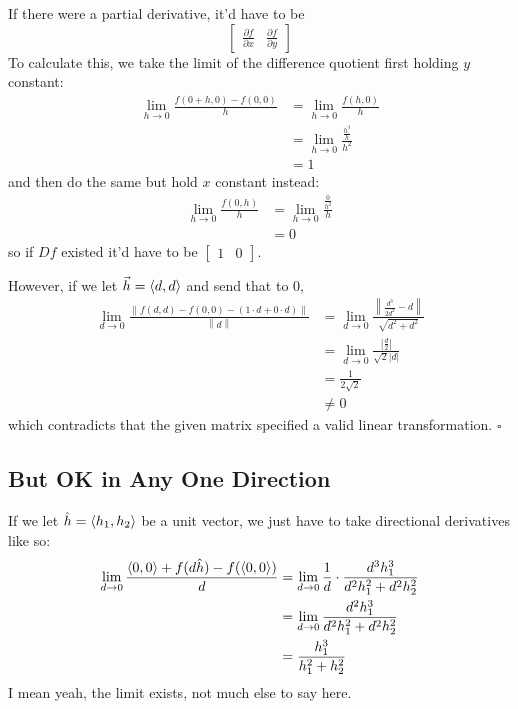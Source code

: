 \documentclass[12pt]{article}
\newcommand{\norm}[1]{\left\lVert#1\right\rVert}
\begin{document}
If there were a partial derivative, it'd have to be
\[\begin{bmatrix}\frac{\partial f}{\partial x} & \frac{\partial f}{\partial y}\end{bmatrix}\]
To calculate this, we take the limit of the difference quotient first holding $y$ constant:
\begin{align*}
  \lim_{h \to 0} \frac{f(0 + h, 0)-f(0, 0)}{h}
   & = \lim_{h \to 0} \frac{f(h, 0)}{h}         \\
   & = \lim_{h \to 0} \frac{\frac{h^3}{h}}{h^2} \\
   & = 1
\end{align*}
and then do the same but hold $x$ constant instead:
\begin{align*}
  \lim_{h \to 0} \frac{f(0, h)}{h}
   & = \lim_{h \to 0} \frac{\frac{0}{h^2}}{h} \\
   & = 0
\end{align*}
so if $Df$ existed it'd have to be $\begin{bmatrix}1 & 0\end{bmatrix}$.

However, if we let $\vec{h}=\braket{d, d}$ and send that to $0$,
\begin{align*}
  \lim_{d \to 0} \frac{\norm{f(d, d)-f(0, 0)-(1 \cdot d + 0 \cdot d)}}{\norm{d}}
   & = \lim_{d \to 0} \frac{\norm{\frac{d^3}{2d^2}-d}}{\sqrt{d^2 + d^2}} \\
   & = \lim_{d \to 0} \frac{\left|\frac{d}{2}\right|}{\sqrt{2}|d|}       \\
   & = \frac{1}{2\sqrt{2}}                                               \\
   & \ne 0
\end{align*}
which contradicts that the given matrix specified a valid linear transformation. $\square$

\pagebreak

\subsection{But OK in Any One Direction}

If we let $\hat{h}=\braket{h_1, h_2}$ be a unit vector,
we just have to take directional derivatives like so:
\begin{align*}
  \lim_{d \to 0} \frac{\braket{0, 0} + f(d\hat{h})-f(\braket{0, 0})}{d}
   & = \lim_{d \to 0} \frac{1}{d} \cdot \frac{d^3h_1^3}{d^2h_1^2+d^2h_2^2} \\
   & = \lim_{d \to 0} \frac{d^2h_1^3}{d^2h_1^2+d^2h_2^2}                   \\
   & = \frac{h_1^3}{h_1^2+h_2^2}
\end{align*}
I mean yeah, the limit exists, not much else to say here.
\end{document}
